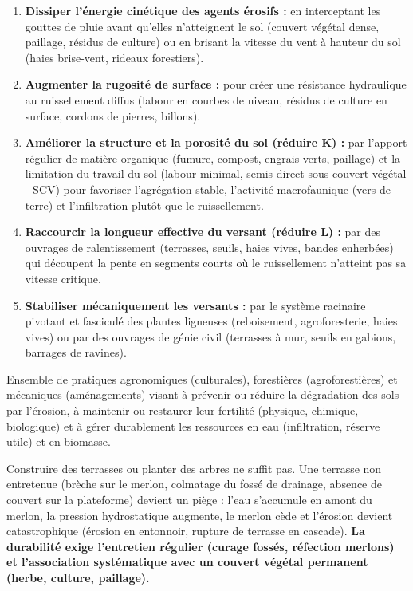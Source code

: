 \documentclass[11pt]{article}
\begin{document}
\begin{enumerate}
    \item \textbf{Dissiper l'énergie cinétique des agents érosifs :} en interceptant les gouttes de pluie avant qu'elles n'atteignent le sol (couvert végétal dense, paillage, résidus de culture) ou en brisant la vitesse du vent à hauteur du sol (haies brise-vent, rideaux forestiers).
    \item \textbf{Augmenter la rugosité de surface :} pour créer une résistance hydraulique au ruissellement diffus (labour en courbes de niveau, résidus de culture en surface, cordons de pierres, billons).
    \item \textbf{Améliorer la structure et la porosité du sol (réduire K) :} par l'apport régulier de matière organique (fumure, compost, engrais verts, paillage) et la limitation du travail du sol (labour minimal, semis direct sous couvert végétal - SCV) pour favoriser l'agrégation stable, l'activité macrofaunique (vers de terre) et l'infiltration plutôt que le ruissellement.
    \item \textbf{Raccourcir la longueur effective du versant (réduire L) :} par des ouvrages de ralentissement (terrasses, seuils, haies vives, bandes enherbées) qui découpent la pente en segments courts où le ruissellement n'atteint pas sa vitesse critique.
    \item \textbf{Stabiliser mécaniquement les versants :} par le système racinaire pivotant et fasciculé des plantes ligneuses (reboisement, agroforesterie, haies vives) ou par des ouvrages de génie civil (terrasses à mur, seuils en gabions, barrages de ravines).
\end{enumerate}

\begin{definition}
Ensemble de pratiques agronomiques (culturales), forestières (agroforestières) et mécaniques (aménagements) visant à prévenir ou réduire la dégradation des sols par l'érosion, à maintenir ou restaurer leur fertilité (physique, chimique, biologique) et à gérer durablement les ressources en eau (infiltration, réserve utile) et en biomasse.
\end{definition}

\begin{attention}
Construire des terrasses ou planter des arbres ne suffit pas. Une terrasse non entretenue (brèche sur le merlon, colmatage du fossé de drainage, absence de couvert sur la plateforme) devient un piège : l'eau s'accumule en amont du merlon, la pression hydrostatique augmente, le merlon cède et l'érosion devient catastrophique (érosion en entonnoir, rupture de terrasse en cascade). \textbf{La durabilité exige l'entretien régulier (curage fossés, réfection merlons) et l'association systématique avec un couvert végétal permanent (herbe, culture, paillage).}
\end{attention}
\end{document}

